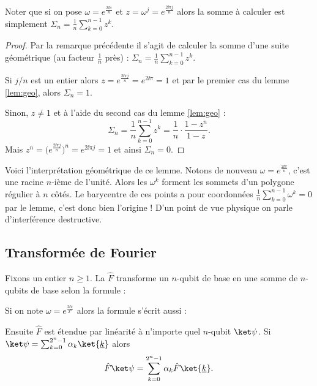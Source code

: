 \documentclass[11pt,class=report,crop=false]{standalone}
\begin{document}
Noter que si on pose $\omega = e^{\frac{2\ii\pi}{n}}$ et $z=\omega^j = e^{\frac{2\ii\pi j}{n}}$
alors la somme à calculer est simplement $\Sigma_n=\frac1n\sum_{k=0}^{n-1}z^k$.

\begin{proof}
Par la remarque précédente il s'agit de calculer la somme d'une suite géométrique (au facteur $\frac1n$ près) : 
$\Sigma_n=\frac1n\sum_{k=0}^{n-1}z^k$.

Si $j/n$ est un entier alors $z= e^{\frac{2\ii\pi j}{n}} = e^{2\ii\pi} = 1$ et par le premier cas du lemme \ref{lem:geo}, alors
$\Sigma_n = 1$.

Sinon, $z\neq1$ et à l'aide du second cas du lemme \ref{lem:geo} :
$$\Sigma_n = \frac1n \sum_{k=0}^{n-1}z^k = \frac1n \cdot \frac{1-z^{n}}{1-z}.$$
Mais $z^n = \big(e^{\frac{2\ii\pi j}{n}}\big)^n  = e^{2\ii\pi j} = 1$ et ainsi $\Sigma_n = 0$.

\end{proof}

Voici l'interprétation géométrique de ce lemme. Notons de nouveau $\omega = e^{\frac{2\ii\pi}{n}}$, c'est une racine $n$-ième de l'unité.
Alors les $\omega^k$ forment les sommets d'un polygone régulier à $n$ côtés. 
Le barycentre de ces points a pour coordonnées $\frac1n \sum_{k=0}^{n-1} \omega^k = 0$ par le lemme, c'est donc bien l'origine !
D'un point de vue physique on parle d'interférence destructive.


 
\subsection{Transformée de Fourier}

Fixons un entier $n\ge1$.
La  $\hat F$ transforme un $n$-qubit de base en une somme de $n$-qubits de base selon la formule :

Si on note $\omega = e^{\frac{2\ii\pi}{2^n}}$ alors la formule s'écrit aussi :

Ensuite $\hat F$ est étendue par linéarité à n'importe quel $n$-qubit $\ket\psi$.
Si $\ket\psi = \sum_{k=0}^{2^n-1} \alpha_k \ket{\underline k}$
alors 
$$ \hat F \ket\psi = \sum_{k=0}^{2^n-1} \alpha_k \hat F \ket{\underline k}.$$
\end{document}
